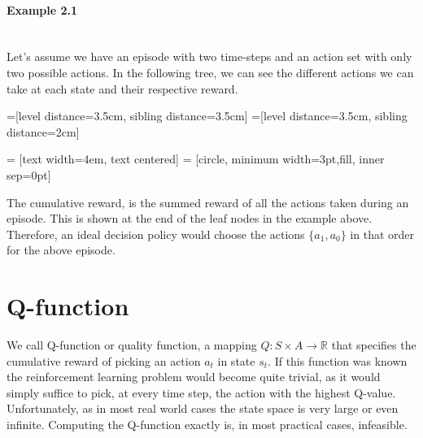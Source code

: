 \paragraph{Example 2.1}\mbox{}\\
Let's assume we have an episode with two time-steps and an action set with only two possible actions. In the following tree, we can see the different actions we can take at each state and their respective reward.

=[level distance=3.5cm, sibling distance=3.5cm]
=[level distance=3.5cm, sibling distance=2cm]

 = [text width=4em, text centered]
 = [circle, minimum width=3pt,fill, inner sep=0pt]

\begin{center}
	
\end{center}
The cumulative reward, is the summed reward of all the actions taken during an episode. This is shown at the end of the leaf nodes in the example above. Therefore, an ideal decision policy would choose the actions $\{a_1,a_0\}$ in that order for the above episode.
 \section{Q-function}
 We call Q-function or quality function, a mapping $Q:S \times A \rightarrow \mathbb{R}$ that specifies the cumulative reward of picking an action $a_t$ in state $s_t$. If this function was known the reinforcement learning problem would become quite trivial, as it would simply suffice to pick, at every time step, the action with the highest Q-value.\\
 Unfortunately, as in most real world cases the state space is very large or even infinite. Computing the Q-function exactly is, in most practical cases, infeasible.
